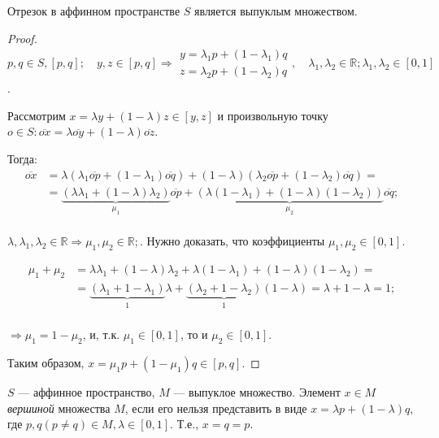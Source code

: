 \begin{utv}
	Отрезок в аффинном пространстве $S$ является выпуклым множеством.
\end{utv}
\begin{proof}
	$p, q \in S, [p, q]; \quad y, z \in [p, q] \Rightarrow \begin{matrix}
		y = \lambda_1 p + (1 - \lambda_1) q \\
		z = \lambda_2 p + (1 - \lambda_2) q
	\end{matrix}, \quad \lambda_1, \lambda_2 \in \mathbb{R}; \lambda_1, \lambda_2 \in [0, 1]$. 
	
	Рассмотрим $x = \lambda y + (1 - \lambda) z \in [y, z]$ и произвольную точку $o \in S: \overline{ox} = \lambda \overline{oy} + (1 - \lambda) \overline{oz}$.
	
	Тогда:
	\begin{align*}
		\overline{ox} &= \lambda (\lambda_1 \overline{op} + (1 - \lambda_1) \overline{oq}) + (1 - \lambda) (\lambda_2 \overline{op} + (1 - \lambda_2) \overline{oq}) = \\ &= \underbrace{(\lambda \lambda_1 + (1 - \lambda) \lambda_2)}_{\mu_1} \overline{op} + \underbrace{(\lambda (1 - \lambda_1) + (1 - \lambda) (1 - \lambda_2))}_{\mu_2} \overline{oq}; \\
	\end{align*}
	
	$\lambda, \lambda_1, \lambda_2 \in \mathbb{R} \Rightarrow \mu_1, \mu_2 \in \mathbb{R};$. Нужно доказать, что коэффициенты $\mu_1, \mu_2 \in [0, 1]$. 
		
	\begin{align*}
		\mu_1 + \mu_2 &= \lambda \lambda_1 + (1 - \lambda) \lambda_2 + \lambda (1 - \lambda_1) + (1 - \lambda) (1 - \lambda_2) = \\ &= \underbrace{(\lambda_1 + 1 - \lambda_1)}_{1} \lambda + \underbrace{(\lambda_2 + 1 - \lambda_2)}_{1} (1 - \lambda) = \lambda + 1 - \lambda = 1; \\
	\end{align*}
	
	$\Rightarrow \mu_1 = 1 - \mu_2$, и, т.к. $\mu_1 \in [0,1]$, то и $\mu_2 \in [0, 1]$. 
	
	Таким образом, $x = \mu_1 p + (1 - \mu_1) q \in [p, q]$. 
\end{proof}

\begin{definition}
	$S$ --- аффинное пространство, $M$ --- выпуклое множество. Элемент $x \in M$ \textit{вершиной} множества $M$, если его нельзя представить в виде $x = \lambda p + (1 - \lambda) q$, где $p, q (p \not = q) \in M, \lambda \in [0, 1]$. Т.е., $x = q = p$. 
\end{definition}